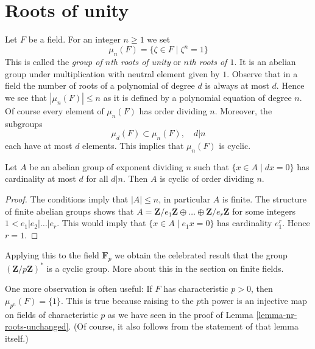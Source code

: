 \section{Roots of unity}
\label{section-roots-of-1}

\noindent
Let $F$ be a field. For an integer $n \geq 1$ we set
$$
\mu_n(F) = \{\zeta \in F \mid \zeta^n = 1\}
$$
This is called the {\it group of $n$th roots of unity} or
{\it $n$th roots of $1$}. It is an abelian group under multiplication
with neutral element given by $1$.
Observe that in a field the number of roots of a polynomial of degree $d$
is always at most $d$. Hence we see that $|\mu_n(F)| \leq n$
as it is defined by a polynomial equation of degree $n$.
Of course every element of $\mu_n(F)$ has order dividing $n$.
Moreover, the subgroups
$$
\mu_d(F) \subset \mu_n(F),\quad d | n
$$
each have at most $d$ elements. This implies that $\mu_n(F)$ is cyclic.

\begin{lemma}
\label{lemma-cyclic}
Let $A$ be an abelian group of exponent dividing $n$ such that
$\{x \in A \mid dx = 0\}$ has cardinality at most $d$ for all $d | n$.
Then $A$ is cyclic of order dividing $n$.
\end{lemma}

\begin{proof}
The conditions imply that $|A| \leq n$, in particular $A$ is finite.
The structure of finite abelian groups shows that
$A = \mathbf{Z}/e_1\mathbf{Z} \oplus \ldots \oplus \mathbf{Z}/e_r\mathbf{Z}$
for some integers $1 < e_1 | e_2 | \ldots | e_r$. This would imply
that $\{x \in A \mid e_1 x = 0\}$ has cardinality $e_1^r$. Hence
$r = 1$.
\end{proof}

\noindent
Applying this to the field $\mathbf{F}_p$ we obtain the celebrated result
that the group $(\mathbf{Z}/p\mathbf{Z})^*$ is a cyclic group. More about
this in the section on finite fields.

\medskip\noindent
One more observation is often useful: If $F$ has characteristic
$p > 0$, then $\mu_{p^n}(F) = \{1\}$. This is true because raising
to the $p$th power is an injective map on fields of characteristic $p$
as we have seen in the proof of Lemma \ref{lemma-nr-roots-unchanged}.
(Of course, it also follows from the statement of that lemma itself.)






